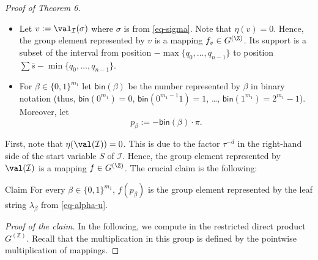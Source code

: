 \begin{proof}[Proof of Theorem 6]
\begin{itemize}
the group element represented by $u$ can be written as
$f_u \tau^{|\val(\mathcal{G}_2)|}$ for a mapping $f_u \in G^{(\Z)}$. 
\item Let $v := \val_{\mathcal{I}}(\sigma)$ where $\sigma$ is from \eqref{eq-sigma}. Note that $\eta(v)=0$.
Hence, the group element represented by $v$ is a mapping $f_v \in G^{(\Z)}$. Its support is a subset of 
the interval from position $-\max\{ q_0, \ldots, q_{n-1}\}$ 
to position $\sum \overline{s}-\min\{ q_0, \ldots, q_{n-1}\}$.
\item For $\beta \in \{0,1\}^{m_1}$ let
$\mathsf{bin}(\beta)$ be the number represented by $\beta$ in binary notation (thus, $\mathsf{bin}(0^{m_1}) = 0$, $\mathsf{bin}(0^{m_1-1}1) = 1$, \ldots, 
$\mathsf{bin}(1^{m_1}) = 2^{m_1}-1$). Moreover, let 
\[ p_\beta := -\mathsf{bin}(\beta) \cdot \pi.\]
\end{itemize}
First, note that $\eta(\val(\mathcal{I})) = 0$. This is due to the factor $\tau^{-d}$ in the right-hand side of the start
variable $S$ of $\mathcal{I}$. Hence, the group element represented by $\val(\mathcal{I})$ is a mapping $f \in G^{(\Z)}$.
The crucial claim is the following:

\medskip
\noindent
\begin{authorclaim}{Claim}
	For every $\beta \in \{0,1\}^{m_1}$, $f(p_{\beta})$ is the group element represented by the leaf string
	$\lambda_{\beta}$ from \eqref{eq-alpha-u}.
\end{authorclaim}


\medskip
\noindent
{\em Proof of the claim.} In the following, we compute in the restricted direct product $G^{(\mathbb{Z})}$.
Recall that the multiplication in this group is defined by the pointwise multiplication of mappings.


\end{proof}
